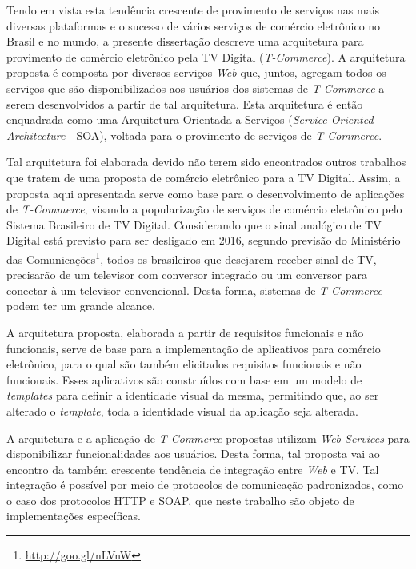Tendo em vista esta tendência crescente de provimento de serviços nas mais 
diversas plataformas e o sucesso de vários serviços de comércio eletrônico 
no Brasil e no mundo, a presente dissertação descreve
uma arquitetura para provimento de comércio eletrônico pela TV Digital (\textit{T-Commerce}).
A arquitetura proposta é composta por diversos serviços \textit{Web} que, juntos,
agregam todos os serviços que são disponibilizados aos usuários 
dos sistemas de \textit{T-Commerce} a serem desenvolvidos a partir de tal arquitetura.
Esta arquitetura é então enquadrada como uma Arquitetura Orientada a Serviços (\textit{Service Oriented Architecture} - SOA),
voltada para o provimento de serviços de \textit{T-Commerce}.

Tal arquitetura foi elaborada devido não terem sido encontrados outros trabalhos
que tratem de uma proposta de comércio eletrônico para a TV Digital.
Assim, a proposta aqui apresentada serve como base para o desenvolvimento
de aplicações de \textit{T-Commerce}, visando a popularização de serviços
de comércio eletrônico pelo Sistema Brasileiro de TV Digital.
Considerando que o sinal analógico de TV Digital está previsto
para ser desligado em 2016, segundo previsão do Ministério das Comunicações\footnote{\url{http://goo.gl/nLVnW}},
todos os brasileiros que desejarem receber sinal de TV, precisarão de um
televisor com conversor integrado ou um conversor para conectar à um televisor convencional.
Desta forma, sistemas de \textit{T-Commerce} podem ter um grande alcance.

A arquitetura proposta, elaborada a partir de requisitos funcionais e não funcionais, 
serve de base para a implementação de aplicativos para comércio eletrônico,
para o qual são também elicitados requisitos funcionais e não funcionais.
Esses aplicativos são construídos com base em um modelo 
de \textit{templates} para definir a identidade
visual da mesma, permitindo que, ao ser alterado o \textit{template}, toda
a identidade visual da aplicação seja alterada.

A arquitetura e a aplicação de \textit{T-Commerce} propostas utilizam \textit{Web Services}
para disponibilizar funcionalidades aos usuários. Desta forma, 
tal proposta vai ao encontro da também crescente tendência de integração entre
\textit{Web} e TV. Tal integração é possível por meio de protocolos de comunicação
padronizados, como o caso dos protocolos HTTP e SOAP, que neste trabalho são 
objeto de implementações específicas.

